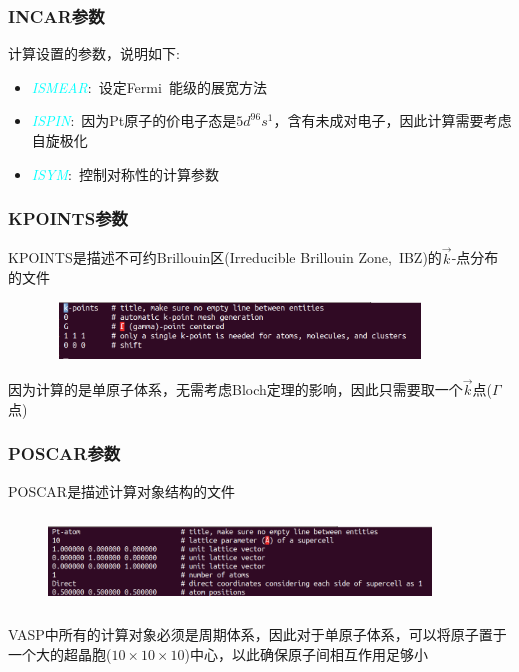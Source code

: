 \frame
{
	\frametitle{\textrm{INCAR}参数}
计算设置的参数，说明如下:~
\begin{itemize}
	\item \textcolor{cyan}{\textit{ISMEAR}}:~设定\textrm{Fermi~}能级的展宽方法
		\vskip 5pt
		{\fontsize{7.2pt}{5.2pt}}
	\item \textcolor{cyan}{\textit{ISPIN}}:~因为\textrm{Pt}原子的价电子态是$5\mathit{d}^96\mathit{s}^1$，含有未成对电子，因此计算需要考虑自旋极化
	\vskip 5pt
	{\fontsize{7.2pt}{5.2pt}}
	\item \textcolor{cyan}{\textit{ISYM}}:~控制对称性的计算参数%
\end{itemize}
}
\frame
{
	\frametitle{\textrm{KPOINTS}参数}
\textrm{KPOINTS}是描述不可约\textrm{Brillouin}区(\textrm{Irreducible Brillouin Zone,~IBZ})的$\vec k$-点分布的文件%
\begin{figure}[h!]
\centering
\vskip -5pt
\includegraphics[height=0.60in,width=4.0in, viewport=0 20 750 118,clip]{Figures/Pt_atom-KPOINTS.png}
\caption{\fontsize{6.2pt}{5.2pt}}%
\label{Pt_atom:KPOINTS}
\end{figure}
因为计算的是单原子体系，无需考虑\textrm{Bloch}定理的影响，因此只需要取一个$\vec k$点($\Gamma$点)
}
\frame
{
	\frametitle{\textrm{POSCAR}参数}
\textrm{POSCAR}是描述计算对象结构的文件%
\begin{figure}[h!]
\centering
\includegraphics[height=0.95in,width=4.0in,viewport=0 0 850 155,clip]{Figures/Pt_atom-POSCAR.png}
\caption{\fontsize{6.2pt}{5.2pt}}%
\label{Pt_atom:POSCAR}
\end{figure}
\textrm{VASP}中所有的计算对象必须是周期体系，因此对于单原子体系，可以将原子置于一个大的超晶胞($10\times10\times10$)中心，以此确保原子间相互作用足够小
}
